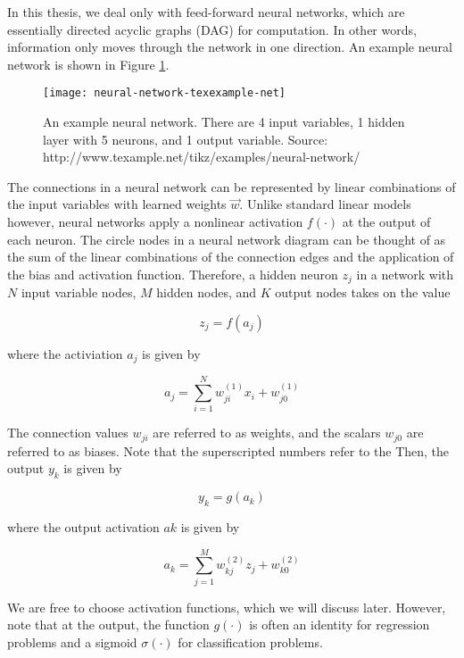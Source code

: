 In this thesis, we deal only with feed-forward neural networks, which are essentially directed acyclic graphs (DAG) for computation. In other words, information only moves through the network in one direction. An example neural network is shown in Figure \ref{fig:nn}.

\begin{figure}[!ht]
\centering
\texttt{[image: neural-network-texexample-net]}
\caption[Example neural network]{An example neural network. There are 4 input variables, 1 hidden layer with 5 neurons, and 1 output variable. Source: http://www.texample.net/tikz/examples/neural-network/}
\label{fig:nn}
\end{figure}

The connections in a neural network can be represented by linear combinations of the input variables with learned weights $\vec{w}$. \cite{bishop} Unlike standard linear models however, neural networks apply a nonlinear activation $f(\cdot)$ at the output of each neuron. The circle nodes in a neural network diagram can be thought of as the sum of the linear combinations of the connection edges and the application of the bias and activation function. Therefore, a hidden neuron $z_{j}$ in a network with $N$ input variable nodes, $M$ hidden nodes, and $K$ output nodes takes on the value

\begin{equation}
z_j = f(a_j)
\end{equation}

where the activiation $a_j$ is given by

\begin{equation}
a_j = \sum_{i=1}^{N} w_{ji}^{(1)}x_i + w_{j0}^{(1)}
\end{equation}

The connection values $w_{ji}$ are referred to as weights, and the scalars $w_{j0}$ are referred to as biases. Note that the superscripted numbers refer to the Then, the output $y_{k}$ is given by

\begin{equation}
y_k = g(a_k)
\end{equation}

where the output activation $a{k}$ is given by

\begin{equation}
a_k = \sum_{j=1}^{M} w_{kj}^{(2)} z_j + w_{k0}^{(2)}
\end{equation}

We are free to choose activation functions, which we will discuss later. However, note that at the output, the function $g(\cdot)$ is often an identity for regression problems and a sigmoid $\sigma(\cdot)$ for classification problems.

